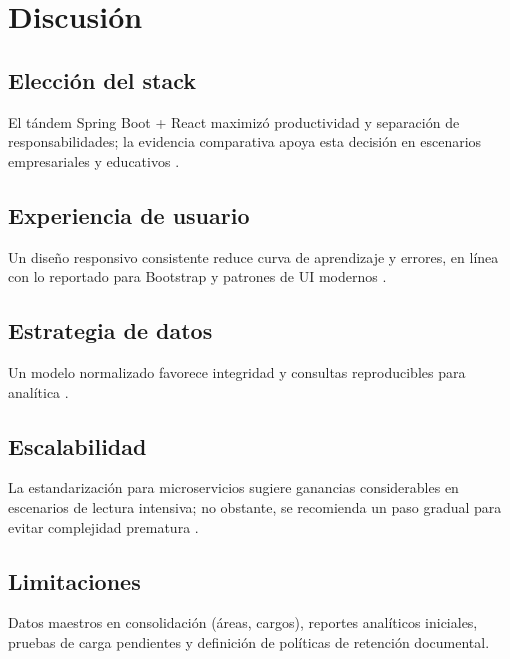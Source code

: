 \section{Discusión}

\subsection{Elección del stack}
El tándem Spring Boot + React maximizó productividad y separación de responsabilidades; la evidencia comparativa apoya esta decisión en escenarios empresariales y educativos \cite{estudio_aplicaciones_java}\cite{analisis_comparativo_java}.

\subsection{Experiencia de usuario}
Un diseño responsivo consistente reduce curva de aprendizaje y errores, en línea con lo reportado para Bootstrap y patrones de UI modernos \cite{optimizacion_bootstrap}\cite{analisis_frameworks_frontend}.

\subsection{Estrategia de datos}
Un modelo normalizado favorece integridad y consultas reproducibles para analítica \cite{analisis_google_charts}.

\subsection{Escalabilidad}
La estandarización para microservicios sugiere ganancias considerables en escenarios de lectura intensiva; no obstante, se recomienda un paso gradual para evitar complejidad prematura \cite{implementacion_microservicios}.

\subsection{Limitaciones}
Datos maestros en consolidación (áreas, cargos), reportes analíticos iniciales, pruebas de carga pendientes y definición de políticas de retención documental.